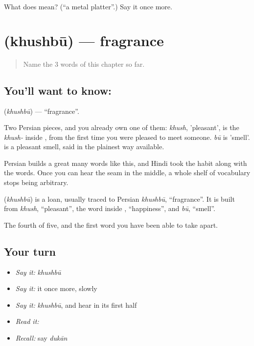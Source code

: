 \begin{tcolorbox}[breakable,colback=teal!4,colframe=teal!35!black,title={Before you move on}]
What does  mean? (\textquotedblleft{}a metal platter\textquotedblright{}.) Say it once more.
\end{tcolorbox}
\section[\texorpdfstring{\hi{ख़ुशबू} (khushbū)}{ख़ुशबू (khushbū)}]{ (khushbū) — fragrance}

\label{lesson:HI-C57-fragrance}



\begin{quote}
Name the 3 words of this chapter so far.
\end{quote}

\subsection*{You'll want to know: }
\textbf{} (\emph{khushbū}) — \textquotedblleft{}fragrance\textquotedblright{}.

Two Persian pieces, and you already own one of them: \emph{khush}, 'pleasant', is the \emph{khush-} inside , from the first time you were pleased to meet someone. \emph{bū} is 'smell'.  is a pleasant smell, said in the plainest way available.

Persian builds a great many words like this, and Hindi took the habit along with the words. Once you can hear the seam in the middle, a whole shelf of vocabulary stops being arbitrary.

\begin{cousinweb}
\textbf{} (\emph{khushbū}) is a loan, usually traced to Persian \emph{khushbū}, \textquotedblleft{}fragrance\textquotedblright{}. It is built from \emph{khush}, \textquotedblleft{}pleasant\textquotedblright{}, the word inside \textbf{}, \textquotedblleft{}happiness\textquotedblright{}, and \emph{bū}, \textquotedblleft{}smell\textquotedblright{}.
\end{cousinweb}

\begin{grammarlens}[title={What you've built}]
The fourth of five, and the first word you have been able to take apart.
\end{grammarlens}

\subsection*{Your turn}
\begin{itemize}
\raggedright
  \item \emph{Say it:} \emph{khushbū}
  \item \emph{Say it:} it once more, slowly
  \item \emph{Say it:} \emph{khushbū}, and hear  in its first half
  \item \emph{Read it:} \textbf{}
  \item \emph{Recall:} say \emph{dukān}
\end{itemize}

